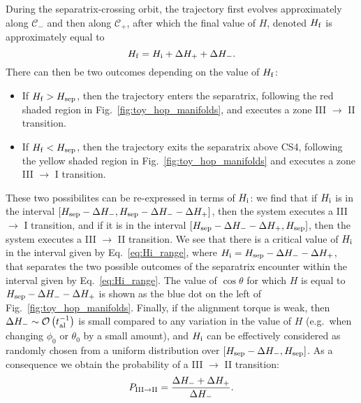 \documentclass[
        fleqn,
        usenatbib,
        referee,
    ]{mnras}
\newcommand*{\p}[1]{\left(#1\right)}
\newcommand*{\s}[1]{\left[#1\right]}
\begin{document}
During the separatrix-crossing orbit, the trajectory first evolves
approximately along $\mathcal{C}_-$ and then along $\mathcal{C}_+$, after which
the final value of $H$, denoted $H_{\rm f}$ is approximately equal to
\begin{equation}
    H_{\rm f} = H_{\rm i} + \Delta H_+ + \Delta H_-.
\end{equation}
There can then be two outcomes depending on the value of $H_{\rm f}$:
\begin{itemize}
    \item If $H_{\rm f} > H_{\rm sep}$, then the trajectory enters the
        separatrix, following the red shaded region in
        Fig.~\ref{fig:toy_hop_manifolds}, and executes a zone III $\to$ II
        transition.

    \item If $H_{\rm f} < H_{\rm sep}$, then the trajectory exits the separatrix
        above CS4, following the yellow shaded region in
        Fig.~\ref{fig:toy_hop_manifolds} and executes a zone III $\to$ I
        transition.
\end{itemize}
These two possibilites can be re-expressed in terms of $H_{\rm i}$: we find that
if $H_{\rm i}$ is in the interval $\s{H_{\rm sep} - \Delta H_-, H_{\rm sep} -
\Delta H_{-} - \Delta H_+}$, then the system executes a III $\to$ I transition,
and if it is in the interval $\s{H_{\rm sep} - \Delta H_- - \Delta H_+, H_{\rm
sep}}$, then the system executes a III $\to$ II transition. We see that there is
a critical value of $H_{\rm i}$ in the interval given by
Eq.~\eqref{eq:Hi_range}, where $H_{\rm i} = H_{\rm sep} - \Delta H_{-} - \Delta
H_+$, that separates the two possible outcomes of the separatrix encounter
within the interval given by Eq.~\eqref{eq:Hi_range}. The value of $\cos \theta$
for which $H$ is equal to $H_{\rm sep} - \Delta H_{-} - \Delta H_+$ is shown as
the blue dot on the left of Fig.~\ref{fig:toy_hop_manifolds}. Finally, if the
alignment torque is weak, then $\Delta H_- \sim \mathcal{O}\p{t_{\rm al}^{-1}}$
is small compared to any variation in the value of $H$ (e.g.\ when changing
$\phi_0$ or $\theta_0$ by a small amount), and $H_{\rm i}$ can be effectively
considered as randomly chosen from a uniform distribution over $\s{H_{\rm sep} -
\Delta H_-, H_{\rm sep}}$. As a consequence we obtain the probability of a III
$\to$ II transition:
\begin{equation}
    P_{\rm III \to II} = \frac{\Delta H_- + \Delta H_+}{\Delta H_-}.
        \label{eq:def_P32_toy}
\end{equation}
\end{document}
